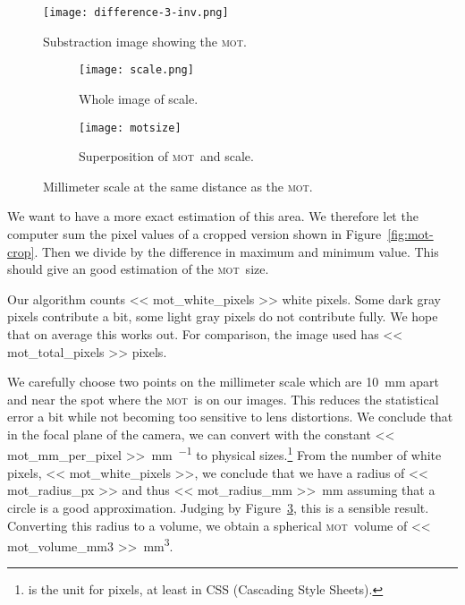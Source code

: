 \documentclass[11pt, english, fleqn, DIV=15, headinclude, BCOR=2cm]{scrreprt}
\newcommand\mot{\textsc{mot}}
\begin{document}
\begin{figure}
    \centering
    \texttt{[image: difference-3-inv.png]}
    \caption{Substraction image showing the \mot.}
    \label{fig:difference-3-inv}
\end{figure}

\begin{figure}
    \begin{subfigure}{.45\textwidth}
        \centering
        \texttt{[image: scale.png]}
        \caption{Whole image of scale.}
        \label{fig:scale}
    \end{subfigure}
    \hfill
    \begin{subfigure}{.45\textwidth}
        \centering
        \texttt{[image: motsize]}
        \caption{Superposition of \mot\ and scale.}
        \label{fig:motsize}
    \end{subfigure}
    \caption{Millimeter scale at the same distance as the \mot.}
    \label{fig:mot_size}
\end{figure}

We want to have a more exact estimation of this area. We therefore let the
computer sum the pixel values of a cropped version shown in
Figure~\ref{fig:mot-crop}. Then we divide by the difference in maximum and
minimum value. This should give an good estimation of the \mot\ size.

Our algorithm counts \num{<< mot_white_pixels >>} white pixels. Some dark gray
pixels contribute a bit, some light gray pixels do not contribute fully. We
hope that on average this works out. For comparison, the image used has \num{<<
mot_total_pixels >>} pixels.

We carefully choose two points on the millimeter scale which are
\SI{10}{\milli\meter} apart and near the spot where the \mot\ is on our images.
This reduces the statistical error a bit while not becoming too sensitive to
lens distortions. We conclude that in the focal plane of the camera, we can
convert with the constant \SI{<< mot_mm_per_pixel >>}{\milli\meter\per\pixel}
to physical sizes.\footnote{\si{\pixel} is the unit for pixels, at least in CSS
(Cascading Style Sheets).} From the number of white pixels, \num{<<
mot_white_pixels >>}, we conclude that we have a radius of \SI{<< mot_radius_px
>>}{\pixel} and thus \SI{<< mot_radius_mm >>}{\milli\meter} assuming that a
circle is a good approximation. Judging by Figure~\ref{fig:motsize}, this is a
sensible result. Converting this radius to a volume, we obtain a spherical
\mot\ volume of \SI{<< mot_volume_mm3 >>}{\milli\meter\cubed}.
\end{document}
